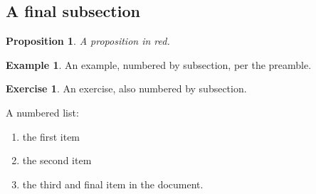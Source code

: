 \documentclass[11pt,letterpaper,pdftex]{amsart}
\theoremstyle{definition}
\newtheorem{ex}{Example}[subsection] %
\newtheorem{exc}{Exercise}[subsection] %
\theoremstyle{plain}
\newtheorem{prp}{Proposition}[section]
\begin{document}
\subsection{A final subsection}

\begin{prp} \color{red}A proposition in red.%
\end{prp}

\begin{ex} An example, numbered by subsection, per the preamble. 
\end{ex}

\begin{exc} An exercise, also numbered by subsection.
\end{exc}

\noindent A numbered list:
\begin{enumerate} 
\item the first item
\item the second item 
\item the third and final item in the document.
\end{enumerate} %
\end{document}
